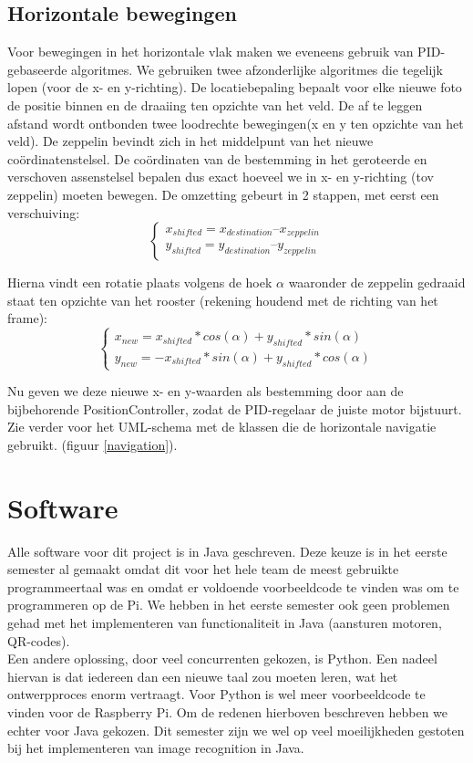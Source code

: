 \documentclass[eind]{penoverslag}
\begin{document}
\subsection{Horizontale bewegingen}
Voor bewegingen in het horizontale vlak maken we eveneens gebruik van PID-gebaseerde algoritmes. We gebruiken twee afzonderlijke algoritmes die tegelijk lopen (voor de x- en y-richting). De locatiebepaling bepaalt voor elke nieuwe foto de positie binnen en de draaiing ten opzichte van het veld. De af te leggen afstand wordt ontbonden twee loodrechte bewegingen(x en y ten opzichte van het veld). De zeppelin bevindt zich in het middelpunt van het nieuwe co\"ordinatenstelsel. De co\"{o}rdinaten van de bestemming in het geroteerde en verschoven assenstelsel bepalen dus exact hoeveel we in x- en y-richting (tov zeppelin) moeten bewegen. De omzetting gebeurt in 2 stappen, met eerst een verschuiving:
\begin{equation}
 \begin{cases}
  x_{shifted} = x_{destination} – x_{zeppelin}\\
  y_{shifted} = y_{destination} – y_{zeppelin}
 \end{cases}
\end{equation}



Hierna vindt een rotatie plaats volgens de hoek $\alpha$ waaronder de zeppelin gedraaid staat ten opzichte van het rooster (rekening houdend met de richting van het frame):
\begin{equation}
 \begin{cases}
 x_{new} = x_{shifted}*cos(\alpha) + y_{shifted}*sin(\alpha)\\
y_{new} = -x_{shifted}*sin(\alpha) + y_{shifted}*cos(\alpha)
 \end{cases}
\end{equation}

Nu geven we deze nieuwe x- en y-waarden als bestemming door aan de bijbehorende PositionController, zodat de PID-regelaar de juiste motor bijstuurt. Zie verder voor het UML-schema met de klassen die de horizontale navigatie gebruikt. (figuur \ref{navigation}).

\section{Software}

Alle software voor dit project is in Java geschreven. Deze keuze is in het eerste semester al gemaakt omdat dit voor het hele team de meest gebruikte programmeertaal was en omdat er voldoende voorbeeldcode te vinden was om te programmeren op de Pi. We hebben in het eerste semester ook geen problemen gehad met het implementeren van functionaliteit in Java (aansturen motoren, QR-codes). \\
Een andere oplossing, door veel concurrenten gekozen, is Python. Een nadeel hiervan is dat iedereen dan een nieuwe taal zou moeten leren, wat het ontwerpproces enorm vertraagt. Voor Python is wel meer voorbeeldcode te vinden voor de Raspberry Pi. Om de redenen hierboven beschreven hebben we echter voor Java gekozen. Dit semester zijn we wel op veel moeilijkheden gestoten bij het implementeren van image recognition in Java.
\end{document}
